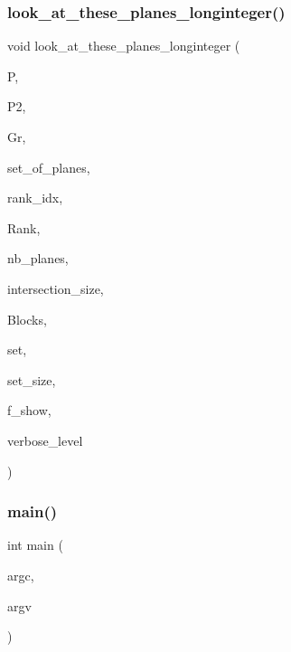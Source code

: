 \subsubsection{\texorpdfstring{look\+\_\+at\+\_\+these\+\_\+planes\+\_\+longinteger()}{look\_at\_these\_planes\_longinteger()}}
{\footnotesize\ttfamily void look\+\_\+at\+\_\+these\+\_\+planes\+\_\+longinteger (\begin{DoxyParamCaption}\item[{\mbox{\hyperlink{classprojective__space}{projective\+\_\+space}} $\ast$}]{P,  }\item[{\mbox{\hyperlink{classprojective__space}{projective\+\_\+space}} $\ast$}]{P2,  }\item[{\mbox{\hyperlink{classgrassmann}{grassmann}} $\ast$}]{Gr,  }\item[{\mbox{\hyperlink{galois_8h_a09fddde158a3a20bd2dcadb609de11dc}{I\+NT}} $\ast$}]{set\+\_\+of\+\_\+planes,  }\item[{\mbox{\hyperlink{galois_8h_a09fddde158a3a20bd2dcadb609de11dc}{I\+NT}} $\ast$}]{rank\+\_\+idx,  }\item[{\mbox{\hyperlink{classlonginteger__object}{longinteger\+\_\+object}} $\ast$}]{Rank,  }\item[{\mbox{\hyperlink{galois_8h_a09fddde158a3a20bd2dcadb609de11dc}{I\+NT}}}]{nb\+\_\+planes,  }\item[{\mbox{\hyperlink{galois_8h_a09fddde158a3a20bd2dcadb609de11dc}{I\+NT}}}]{intersection\+\_\+size,  }\item[{\mbox{\hyperlink{galois_8h_a09fddde158a3a20bd2dcadb609de11dc}{I\+NT}} $\ast$}]{Blocks,  }\item[{\mbox{\hyperlink{galois_8h_a09fddde158a3a20bd2dcadb609de11dc}{I\+NT}} $\ast$}]{set,  }\item[{\mbox{\hyperlink{galois_8h_a09fddde158a3a20bd2dcadb609de11dc}{I\+NT}}}]{set\+\_\+size,  }\item[{\mbox{\hyperlink{galois_8h_a09fddde158a3a20bd2dcadb609de11dc}{I\+NT}}}]{f\+\_\+show,  }\item[{\mbox{\hyperlink{galois_8h_a09fddde158a3a20bd2dcadb609de11dc}{I\+NT}}}]{verbose\+\_\+level }\end{DoxyParamCaption})}

\mbox{\label{analyze_8_c_a3c04138a5bfe5d72780bb7e82a18e627}} 
\subsubsection{\texorpdfstring{main()}{main()}}
{\footnotesize\ttfamily int main (\begin{DoxyParamCaption}\item[{int}]{argc,  }\item[{char $\ast$$\ast$}]{argv }\end{DoxyParamCaption})}




